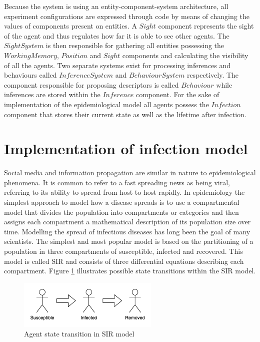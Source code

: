 Because the system is using an entity-component-system architecture, all experiment configurations are expressed through code by means of changing the values of components present on entities.
A $Sight$ component represents the sight of the agent and thus regulates how far it is able to see other agents.
The $SightSystem$ is then responsible for gathering all entities possessing the $WorkingMemory$, $Position$ and $Sight$ components and calculating the visibility of all the agents.
Two separate systems exist for processing inferences and behaviours called $InferenceSystem$ and $BehaviourSystem$ respectively.
The component responsible for proposing descriptors is called $Behaviour$ while inferences are stored within the $Inference$ component.
For the sake of implementation of the epidemiological model all agents possess the $Infection$ component that stores their current state as well as the lifetime after infection.

\section{Implementation of infection model}

Social media and information propagation are similar in nature to epidemiological phenomena.
It is common to refer to a fast spreading news as being viral, referring to its ability to spread from host to host rapidly.
In epidemiology the simplest approach to model how a disease spreads is to use a compartmental model that divides the population into compartments or categories and then assigns each compartment a mathematical description of its population size over time.
Modelling the spread of infectious diseases has long been the goal of many scientists\cite{liu2016}.
The simplest and most popular model is based on the partitioning of a population in three compartments of susceptible, infected and recovered\cite{weiss2013sir}.
This model is called SIR and consists of three differential equations describing each compartment.
Figure \ref{fig:sir.drawio.png} illustrates possible state transitions within the SIR model.

\begin{figure}[H]
    \centering
    \includegraphics[width=0.6\textwidth]{images/chapter2/sir.drawio.png}
    \caption{Agent state transition in SIR model}\label{fig:sir.drawio.png}
\end{figure}

